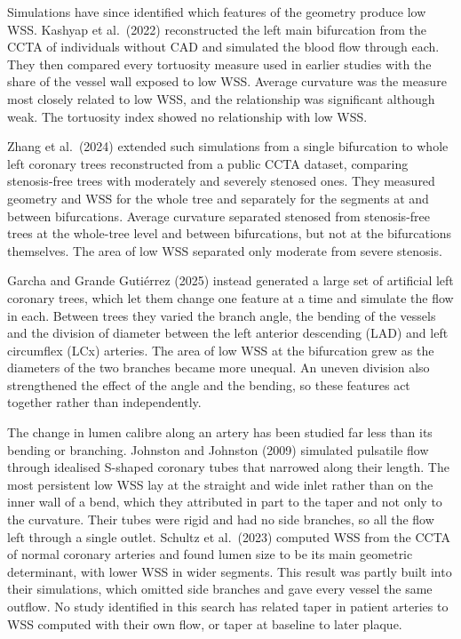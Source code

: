 Simulations have since identified which features of the geometry produce low WSS.
Kashyap et al.\ (2022) \cite{kashyap2022tortuosity} reconstructed the left main bifurcation from the
CCTA of individuals without CAD and simulated the blood flow through each.
They then compared every tortuosity measure used in earlier studies with the share of the vessel
wall exposed to low WSS.
Average curvature was the measure most closely related to low WSS, and the relationship was
significant although weak.
The tortuosity index showed no relationship with low WSS.

Zhang et al.\ (2024) \cite{zhang2024curvature} extended such simulations from a single bifurcation to
whole left coronary trees reconstructed from a public CCTA dataset, comparing stenosis-free trees
with moderately and severely stenosed ones.
They measured geometry and WSS for the whole tree and separately for the segments at and between
bifurcations.
Average curvature separated stenosed from stenosis-free trees at the whole-tree level and between
bifurcations, but not at the bifurcations themselves.
The area of low WSS separated only moderate from severe stenosis.

Garcha and Grande Guti\'errez (2025) \cite{garcha2025sensitivity} instead generated a large set of
artificial left coronary trees, which let them change one feature at a time and simulate the flow
in each.
Between trees they varied the branch angle, the bending of the vessels and the division of diameter
between the left anterior descending (LAD) and left circumflex (LCx) arteries.
The area of low WSS at the bifurcation grew as the diameters of the two branches became more unequal.
An uneven division also strengthened the effect of the angle and the bending, so these features act
together rather than independently.

The change in lumen calibre along an artery has been studied far less than its bending or branching.
Johnston and Johnston (2009) \cite{johnston2009taper} simulated pulsatile flow through idealised
S-shaped coronary tubes that narrowed along their length.
The most persistent low WSS lay at the straight and wide inlet rather than on the inner wall of a
bend, which they attributed in part to the taper and not only to the curvature.
Their tubes were rigid and had no side branches, so all the flow left through a single outlet.
Schultz et al.\ (2023) \cite{schultz2023ess} computed WSS from the CCTA of normal coronary arteries
and found lumen size to be its main geometric determinant, with lower WSS in wider segments.
This result was partly built into their simulations, which omitted side branches and gave every
vessel the same outflow.
No study identified in this search has related taper in patient arteries to WSS computed with their
own flow, or taper at baseline to later plaque.


